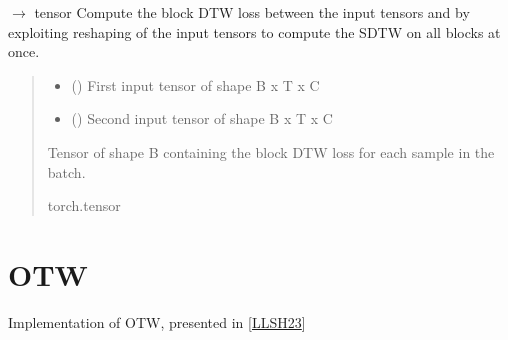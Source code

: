 \documentclass[letterpaper,10pt,english]{sphinxmanual}
\begin{document}
\begin{fulllineitems}
\begin{fulllineitems}
\label{\detokenize{dtw_loss_functions.block_dtw:dtw_loss_functions.block_dtw.block_dtw_optimized.forward}}
\pysigstartsignatures
\pysiglinewithargsret
{}
{\sphinxparamcomma {}}
{{ $\rightarrow$ tensor}}
\pysigstopsignatures
\sphinxAtStartPar
Compute the block DTW loss between the input tensors  and  by exploiting reshaping of the input tensors to compute the SDTW on all blocks at once.
\begin{quote}\begin{description}
\begin{itemize}
\item {} 
\sphinxAtStartPar
{} () \textendash{} First input tensor of shape B x T x C

\item {} 
\sphinxAtStartPar
{} () \textendash{} Second input tensor of shape B x T x C

\end{itemize}

\sphinxAtStartPar
{} \textendash{} Tensor of shape B containing the block DTW loss for each sample in the batch.

\sphinxAtStartPar
torch.tensor

\end{description}\end{quote}

\end{fulllineitems}


\end{fulllineitems}


\sphinxstepscope


\chapter{OTW}
\label{\detokenize{dtw_loss_functions.otw:module-dtw_loss_functions.otw}}\label{\detokenize{dtw_loss_functions.otw:otw}}\label{\detokenize{dtw_loss_functions.otw::doc}}
\sphinxAtStartPar
Implementation of OTW, presented in {[}\hyperlink{cite.biblio:id12}{LLSH23}{]}
\end{document}
